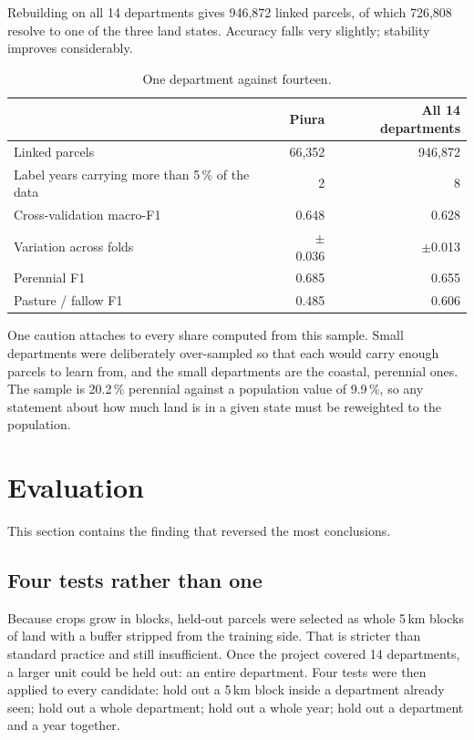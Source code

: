 \documentclass[11pt,a4paper]{article}
\begin{document}
Rebuilding on all 14 departments gives 946{,}872 linked parcels, of which 726{,}808 resolve to
one of the three land states. Accuracy falls very slightly; stability improves considerably.

\begin{table}[htbp]
\centering
\small
\caption{One department against fourteen.}
\label{tab:national}
\begin{tabular}{@{}lrr@{}}
\toprule
& \textbf{Piura} & \textbf{All 14 departments} \\
\midrule
Linked parcels & 66{,}352 & 946{,}872 \\
Label years carrying more than 5\,\% of the data & 2 & 8 \\
Cross-validation macro-F1 & 0.648 & 0.628 \\
Variation across folds & $\pm$0.036 & $\pm$0.013 \\
Perennial F1 & 0.685 & 0.655 \\
Pasture / fallow F1 & 0.485 & 0.606 \\
\bottomrule
\end{tabular}
\end{table}

One caution attaches to every share computed from this sample. Small departments were
deliberately over-sampled so that each would carry enough parcels to learn from, and the small
departments are the coastal, perennial ones. The sample is 20.2\,\% perennial against a
population value of 9.9\,\%, so any statement about how much land is in a given state must be
reweighted to the population.

\section{Evaluation}
\label{sec:evaluation}

This section contains the finding that reversed the most conclusions.

\subsection{Four tests rather than one}

Because crops grow in blocks, held-out parcels were selected as whole 5\,km blocks of land with a
buffer stripped from the training side. That is stricter than standard practice and still
insufficient. Once the project covered 14 departments, a larger unit could be held out: an entire
department. Four tests were then applied to every candidate: hold out a 5\,km block inside a
department already seen; hold out a whole department; hold out a whole year; hold out a
department and a year together.
\end{document}
